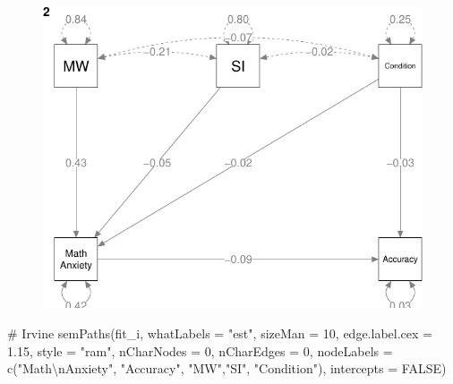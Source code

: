\documentclass[
  letterpaper,
  DIV=11,
  numbers=noendperiod]{scrartcl}
\newenvironment{Shaded}{\begin{snugshade}}{\end{snugshade}}
\newcommand{\AttributeTok}[1]{\textcolor[rgb]{0.40,0.45,0.13}{#1}}
\newcommand{\CommentTok}[1]{\textcolor[rgb]{0.37,0.37,0.37}{#1}}
\newcommand{\ConstantTok}[1]{\textcolor[rgb]{0.56,0.35,0.01}{#1}}
\newcommand{\DecValTok}[1]{\textcolor[rgb]{0.68,0.00,0.00}{#1}}
\newcommand{\FloatTok}[1]{\textcolor[rgb]{0.68,0.00,0.00}{#1}}
\newcommand{\FunctionTok}[1]{\textcolor[rgb]{0.28,0.35,0.67}{#1}}
\newcommand{\NormalTok}[1]{\textcolor[rgb]{0.00,0.23,0.31}{#1}}
\newcommand{\SpecialCharTok}[1]{\textcolor[rgb]{0.37,0.37,0.37}{#1}}
\newcommand{\StringTok}[1]{\textcolor[rgb]{0.13,0.47,0.30}{#1}}
\begin{document}
\begin{figure}[H]

{\centering \includegraphics{modeling2_files/figure-pdf/unnamed-chunk-13-2.pdf}

}

\end{figure}

\begin{Shaded}
\begin{Highlighting}[]
\CommentTok{\# Irvine}
\FunctionTok{semPaths}\NormalTok{(fit\_i,}
         \AttributeTok{whatLabels =} \StringTok{"est"}\NormalTok{,}
         \AttributeTok{sizeMan =} \DecValTok{10}\NormalTok{,}
         \AttributeTok{edge.label.cex =} \FloatTok{1.15}\NormalTok{,}
         \AttributeTok{style =} \StringTok{"ram"}\NormalTok{,}
         \AttributeTok{nCharNodes =} \DecValTok{0}\NormalTok{, }\AttributeTok{nCharEdges =} \DecValTok{0}\NormalTok{,}
         \AttributeTok{nodeLabels =} \FunctionTok{c}\NormalTok{(}\StringTok{"Math}\SpecialCharTok{\textbackslash{}n}\StringTok{Anxiety"}\NormalTok{, }\StringTok{"Accuracy"}\NormalTok{,}
                        \StringTok{"MW"}\NormalTok{,}\StringTok{"SI"}\NormalTok{, }\StringTok{"Condition"}\NormalTok{),}
         \AttributeTok{intercepts =} \ConstantTok{FALSE}\NormalTok{)}
\end{Highlighting}
\end{Shaded}
\end{document}
